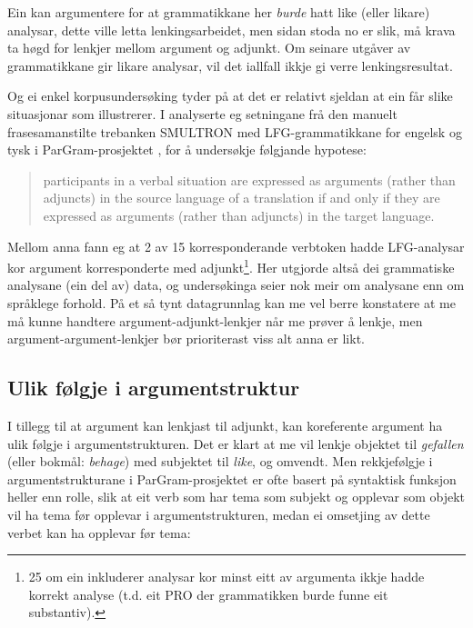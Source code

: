 \documentclass[12pt,a4paper,oneside,draft]{report}
\begin{document}
Ein kan argumentere for at grammatikkane her \emph{burde} hatt like (eller
likare) analysar, dette ville letta lenkingsarbeidet, men sidan stoda
no er slik, må krava ta høgd for lenkjer mellom argument og
adjunkt. Om seinare utgåver av grammatikkane gir likare analysar, vil
det iallfall ikkje gi verre lenkingsresultat.

Og ei enkel korpusundersøking tyder på at det er relativt sjeldan at
ein får slike situasjonar som \Last illustrerer.  I
\citet{unhammer2009aaa} analyserte eg setningane frå den manuelt
frasesamanstilte trebanken SMULTRON \citep{samuelsson2006pap} med
LFG-grammatikkane for engelsk og tysk i ParGram-prosjektet
\citep{butt2002pgp}, for å undersøkje følgjande hypotese:
\begin{quote}
participants in a verbal situation are expressed as
arguments (rather than adjuncts) in the source language of a
translation if and only if they are expressed as arguments (rather
than adjuncts) in the target language.
\end{quote}

Mellom anna fann eg at 2 av 15 korresponderande verbtoken hadde
LFG-analysar kor argument korresponderte med adjunkt\footnote{25 om ein inkluderer analysar kor minst eitt av argumenta
        ikkje hadde korrekt analyse (t.d. eit \textsc{PRO} der
        grammatikken burde funne eit substantiv). }. Her
utgjorde altså dei grammatiske analysane (ein del av) data, og
undersøkinga seier nok meir om analysane enn om språklege forhold. På
et så tynt datagrunnlag kan me vel berre konstatere at me må kunne
handtere argument-adjunkt-lenkjer når me prøver å lenkje, men
argument-argument-lenkjer bør prioriterast viss alt anna er likt.

\subsection{Ulik følgje i argumentstruktur}
\label{sec-3.6.2}

I tillegg til at argument kan lenkjast til adjunkt, kan koreferente
argument ha ulik følgje i argumentstrukturen. Det er klart at me vil
lenkje objektet til \emph{gefallen} (eller bokmål: \emph{behage}) med subjektet
til \emph{like}, og omvendt.  Men rekkjefølgje i argumentstrukturane i
ParGram-prosjektet er ofte basert på syntaktisk funksjon heller enn
rolle, slik at eit verb som har tema som subjekt og opplevar som
objekt vil ha tema før opplevar i argumentstrukturen, medan ei
omsetjing av dette verbet kan ha opplevar før tema:
\end{document}
